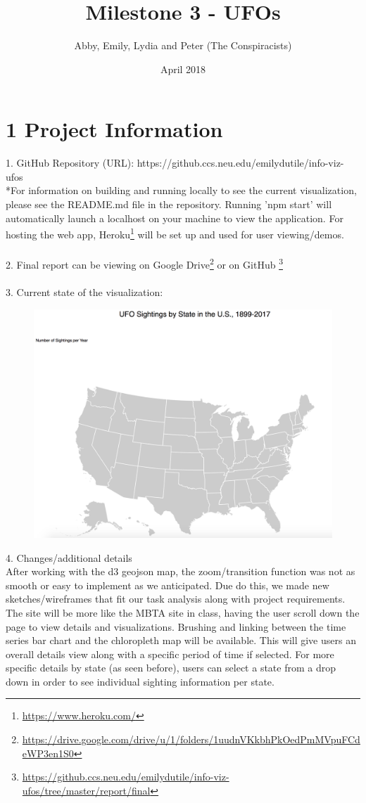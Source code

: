 \documentclass{neu_handout}
\title{Milestone 3 - UFOs}
\author{Abby, Emily, Lydia and Peter (The Conspiracists)}
\date{April 2018}
\begin{document}
\section*{1 Project Information}
1. GitHub Repository (URL): https://github.ccs.neu.edu/emilydutile/info-viz-ufos \\

*For information on building and running locally to see the current visualization, please see the README.md file in the repository. Running 'npm start' will automatically launch a localhost on your machine to view the application. For hosting the web app, Heroku\footnote{\url{https://www.heroku.com/}} will be set up and used for user viewing/demos.\\\\


2. Final report can be viewing on Google Drive\footnote{\url{https://drive.google.com/drive/u/1/folders/1uudnVKkbhPkOedPmMVpuFCdeWP3en1S0}} or on GitHub \footnote{\url{https://github.ccs.neu.edu/emilydutile/info-viz-ufos/tree/master/report/final}} \\\\


3. Current state of the visualization:\\
\begin{figure}[h]
\centering
{
\includegraphics[width=0.6\linewidth]{site}
}
\end{figure}


4. Changes/additional details\\

After working with the d3 geojson map, the zoom/transition function was not as smooth or easy to implement as we anticipated. Due do this, we made new sketches/wireframes that fit our task analysis along with project requirements. The site will be more like the MBTA site in class, having the user scroll down the page to view details and visualizations. Brushing and linking between the time series bar chart and the chloropleth map will be available. This will give users an overall details view along with a specific period of time if selected. For more specific details by state (as seen before), users can select a state from a drop down in order to see individual sighting information per state.
\end{document}
